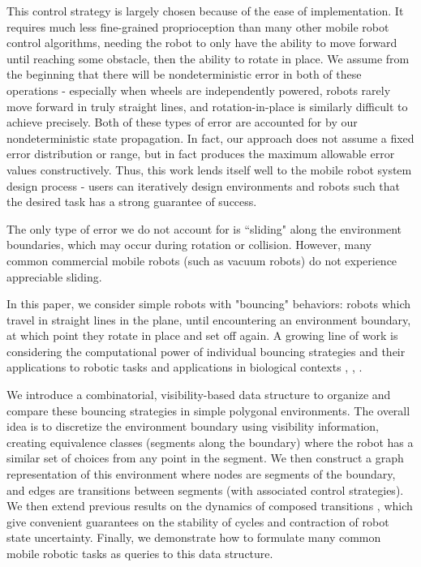 \documentclass[]{article}  %
\begin{document}
This control strategy is largely chosen because of the ease of implementation.
It requires much less fine-grained proprioception than many other mobile robot
control algorithms, needing the robot to only have the ability to move forward
until reaching some obstacle, then the ability to rotate in place. We assume
from the beginning that there will be nondeterministic error in both of these
operations - especially when wheels are independently powered, robots rarely
move forward in truly straight lines, and rotation-in-place is similarly
difficult to achieve precisely. Both of these types of error are accounted for
by our nondeterministic state propagation. In fact, our approach does not assume
a fixed error distribution or range, but in fact produces the maximum allowable
error values constructively. Thus, this work lends itself well to the mobile
robot system design process - users can iteratively design environments and
robots such that the desired task has a strong guarantee of success.

The only type of error we do not
account for is ``sliding" along the environment boundaries, which may occur
during rotation or collision. However, many common commercial mobile robots
(such as vacuum robots) do not experience appreciable sliding.

In this paper, we consider simple robots with "bouncing" behaviors: robots which
travel in straight lines in the plane, until encountering an environment
boundary, at which point they rotate in place and set off again. A growing line
of work is considering the computational power of individual bouncing strategies
and their applications to robotic tasks and applications in biological contexts
\cite{ErLav13}, \cite{microorganism2017}, \cite{alam2017minimalist}.

We introduce a combinatorial, visibility-based data structure to organize and
compare these bouncing strategies in simple polygonal environments. The overall
idea is to discretize the environment boundary using visibility information,
creating equivalence classes (segments along the boundary) where the robot has a
similar set of choices from any point in the segment. We then construct a graph
representation of this environment where nodes are segments of the boundary, and
edges are transitions between segments (with associated control strategies). We
then extend previous results on the dynamics of composed transitions
\cite{NilBecLav17}, which give convenient guarantees on the stability of cycles
and contraction of robot state uncertainty. Finally, we demonstrate how to
formulate many common mobile robotic tasks as queries to this data structure.
\end{document}
